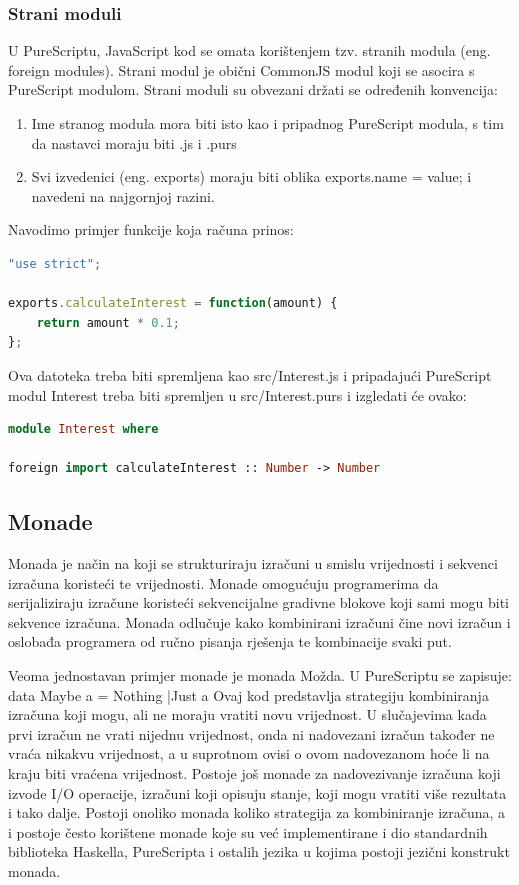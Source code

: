 \documentclass[times, utf8, zavrsni]{fer}
\begin{document}
\subsubsection{Strani moduli}
U PureScriptu, JavaScript kod se omata korištenjem tzv. stranih modula (eng. foreign modules). Strani modul je obični CommonJS modul koji se asocira s PureScript modulom. Strani moduli su obvezani držati se određenih konvencija:
\begin{enumerate}
\item Ime stranog modula mora biti isto kao i pripadnog PureScript modula, s tim da nastavci moraju biti .js i .purs
\item Svi izvedenici (eng. exports) moraju biti oblika exports.name = value; i navedeni na najgornjoj razini.
\end{enumerate}

Navodimo primjer funkcije koja računa prinos:

\begin{lstlisting}[language=JavaScript, basicstyle=\small\linespread{0.8}]
"use strict";

exports.calculateInterest = function(amount) {
	return amount * 0.1;
};
\end{lstlisting}

Ova datoteka treba biti spremljena kao src/Interest.js i pripadajući PureScript modul Interest treba biti spremljen u src/Interest.purs i izgledati će ovako:

\begin{lstlisting}[language=PureScript, basicstyle=\small\linespread{0.8}]
module Interest where

foreign import calculateInterest :: Number -> Number
\end{lstlisting}

\subsection{Monade}
Monada je način na koji se strukturiraju izračuni u smislu vrijednosti i sekvenci izračuna koristeći te vrijednosti. Monade omogućuju programerima da serijaliziraju izračune koristeći sekvencijalne gradivne blokove koji sami mogu biti sekvence izračuna. Monada odlučuje kako kombinirani izračuni čine novi izračun i oslobađa programera od ručno pisanja rješenja te kombinacije svaki put.

Veoma jednostavan primjer monade je monada Možda. U PureScriptu se zapisuje:
data Maybe a = Nothing |Just a
Ovaj kod predstavlja strategiju kombiniranja izračuna koji mogu, ali ne moraju vratiti novu vrijednost. U slučajevima kada prvi izračun ne vrati nijednu vrijednost, onda ni nadovezani izračun također ne vraća nikakvu vrijednost, a u suprotnom ovisi o ovom nadovezanom hoće li na kraju biti vraćena vrijednost.
Postoje još monade za nadovezivanje izračuna koji izvode I/O operacije, izračuni koji opisuju stanje, koji mogu vratiti više rezultata i tako dalje. Postoji onoliko monada koliko strategija za kombiniranje izračuna, a i postoje često korištene monade koje su već implementirane i dio standardnih biblioteka Haskella, PureScripta i ostalih jezika u kojima postoji jezični konstrukt monada.
\end{document}
